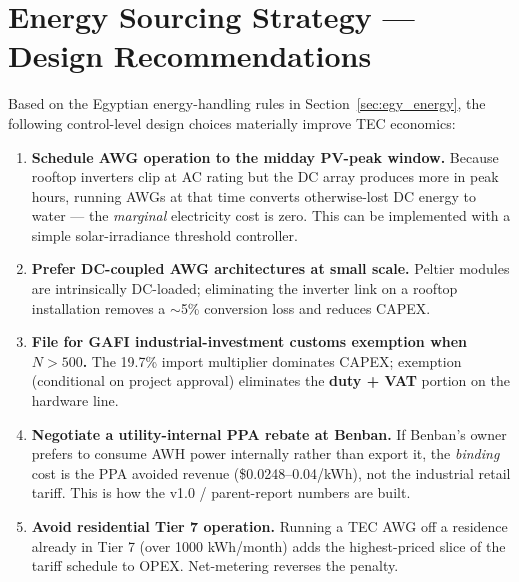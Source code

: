 \documentclass[11pt,a4paper]{article}
\begin{document}
\section{Energy Sourcing Strategy --- Design Recommendations}
\label{sec:energy_strategy}
Based on the Egyptian energy-handling rules in Section~\ref{sec:egy_energy}, the following control-level design choices materially improve TEC economics:

\begin{enumerate}[leftmargin=*]
  \item \textbf{Schedule AWG operation to the midday PV-peak window.} Because rooftop inverters clip at AC rating but the DC array produces more in peak hours, running AWGs at that time converts otherwise-lost DC energy to water --- the \emph{marginal} electricity cost is zero. This can be implemented with a simple solar-irradiance threshold controller.
  \item \textbf{Prefer DC-coupled AWG architectures at small scale.} Peltier modules are intrinsically DC-loaded; eliminating the inverter link on a rooftop installation removes a $\sim$5\% conversion loss and reduces CAPEX.
  \item \textbf{File for GAFI industrial-investment customs exemption when $N>500$.} The 19.7\% import multiplier dominates CAPEX; exemption (conditional on project approval) eliminates the \textbf{duty + VAT} portion on the hardware line.
  \item \textbf{Negotiate a utility-internal PPA rebate at Benban.} If Benban's owner prefers to consume AWH power internally rather than export it, the \emph{binding} cost is the PPA avoided revenue (\$0.0248--0.04/kWh), not the industrial retail tariff. This is how the v1.0 / parent-report numbers are built.
  \item \textbf{Avoid residential Tier 7 operation.} Running a TEC AWG off a residence already in Tier 7 (over 1000 kWh/month) adds the highest-priced slice of the tariff schedule to OPEX. Net-metering reverses the penalty.
\end{enumerate}

\end{document}
